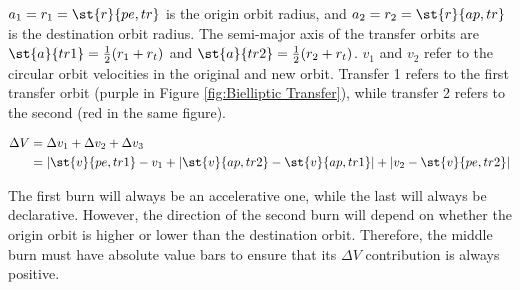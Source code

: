 \documentclass[../basicOrbitalDynamics.tex]{subfiles}
\begin{document}
$a_1=r_1=\st{r}{pe,tr}$ is the origin orbit radius, and $a_2=r_2=\st{r}{ap,tr}$ is the destination orbit radius. The semi-major axis of the transfer orbits are $\st{a}{tr1}=\frac{1}{2}(r_1+r_t)$ and $\st{a}{tr2}=\frac{1}{2}(r_2+r_t)$. $v_1$ and $v_2$ refer to the circular orbit velocities in the original and new orbit. Transfer 1 refers to the first transfer orbit (purple in Figure \ref{fig:Bielliptic Transfer}), while transfer 2 refers to the second (red in the same figure).

\begin{align*}
    \Delta V &= \Delta v_1+\Delta v_2+\Delta v_3 \\
    &= |\st{v}{pe,tr1}-v_1+|\st{v}{ap,tr2}-\st{v}{ap,tr1}|+|v_2-\st{v}{pe,tr2}| \\
\end{align*}

The first burn will always be an accelerative one, while the last will always be declarative. However, the direction of the second burn will depend on whether the origin orbit is higher or lower than the destination orbit. Therefore, the middle burn must have absolute value bars to ensure that its $\Delta V$ contribution is always positive.
\end{document}
